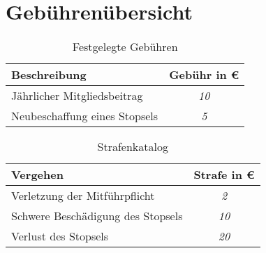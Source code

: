 \section{Gebührenübersicht}
\label{sec:fees}

\newcommand{\svsrEntry}[2]{%
    #1 & \emph{#2} \\
    \hline%
}

\begin{table}[htb]
    \centering
    \begin{tabular}{|l|c|}
        \hline
        \textbf{Beschreibung} & \textbf{Gebühr in \euro} \\
        \hline
        \svsrEntry{Jährlicher Mitgliedsbeitrag}{10}
        \svsrEntry{Neubeschaffung eines Stopsels}{5}
    \end{tabular}
    \caption{Festgelegte Gebühren}
    \label{tab:fees}
\end{table}

\begin{table}[htb]
    \centering
    \begin{tabular}{|l|c|}
        \hline
        \textbf{Vergehen} & \textbf{Strafe in \euro} \\
        \hline
        \svsrEntry{Verletzung der Mitführpflicht}{2}
        \svsrEntry{Schwere Beschädigung des Stopsels}{10}
        \svsrEntry{Verlust des Stopsels}{20}
    \end{tabular}
    \caption{Strafenkatalog}
    \label{tab:penalties}
\end{table}
